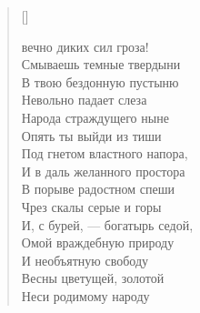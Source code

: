 \settowidth{\versewidth}{\vinТы вечно диких сил гроза!}
\begin{verse}[\versewidth]
\begin{patverse*}
 вечно диких сил гроза!\\
Смываешь темные твердыни\ldotst\\
В твою бездонную пустыню\\
Невольно падает слеза\\
Народа страждущего ныне\ldotst\\
Опять ты выйди из тиши\\
Под гнетом властного напора,\\
И в даль желанного простора\\
В порыве радостном спеши\\
Чрез скалы серые и горы\ldotst\\
И, с бурей, --- богатырь седой,\\
Омой враждебную природу\ldotst\\
И необъятную свободу\\
Весны цветущей, золотой\\
Неси родимому народу\ldotst
\end{patverse*}
\end{verse}

\newpage
\vspace*{0cm}


